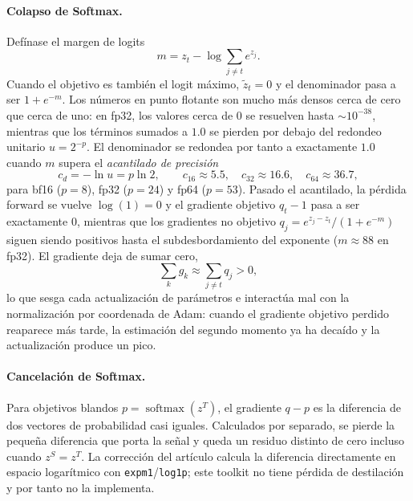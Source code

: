 \paragraph{Colapso de Softmax.} Defínase el margen de logits
\begin{equation}
m = z_t - \log \sum_{j \neq t} e^{z_j}.
\label{eq:margin}
\end{equation}
Cuando el objetivo es también el logit máximo, $\tilde{z}_t = 0$ y el denominador pasa a ser $1 + e^{-m}$. Los números en punto flotante son mucho más densos cerca de cero que cerca de uno: en fp32, los valores cerca de $0$ se resuelven hasta $\sim\!10^{-38}$, mientras que los términos sumados a $1.0$ se pierden por debajo del redondeo unitario $u = 2^{-p}$. El denominador se redondea por tanto a exactamente $1.0$ cuando $m$ supera el \emph{acantilado de precisión}
\begin{equation}
c_d = -\ln u = p \ln 2 ,
\qquad
c_{16} \approx 5.5, \quad c_{32} \approx 16.6, \quad c_{64} \approx 36.7,
\label{eq:cliff}
\end{equation}
para bf16 ($p = 8$), fp32 ($p = 24$) y fp64 ($p = 53$). Pasado el acantilado, la pérdida forward se vuelve $\log(1) = 0$ y el gradiente objetivo $q_t - 1$ pasa a ser exactamente $0$, mientras que los gradientes no objetivo $q_j = e^{z_j - z_t}/(1 + e^{-m})$ siguen siendo positivos hasta el subdesbordamiento del exponente ($m \approx 88$ en fp32). El gradiente deja de sumar cero,
\begin{equation}
\sum_k g_k \approx \sum_{j \neq t} q_j > 0 ,
\label{eq:broken-zero-sum}
\end{equation}
lo que sesga cada actualización de parámetros e interactúa mal con la normalización por coordenada de Adam: cuando el gradiente objetivo perdido reaparece más tarde, la estimación del segundo momento ya ha decaído y la actualización produce un pico.

\paragraph{Cancelación de Softmax.} Para objetivos blandos $p = \operatorname{softmax}(z^{T})$, el gradiente $q - p$ es la diferencia de dos vectores de probabilidad casi iguales. Calculados por separado, se pierde la pequeña diferencia que porta la señal y queda un residuo distinto de cero incluso cuando $z^{S} = z^{T}$. La corrección del artículo calcula la diferencia directamente en espacio logarítmico con \texttt{expm1}/\texttt{log1p}; este toolkit no tiene pérdida de destilación y por tanto no la implementa.

